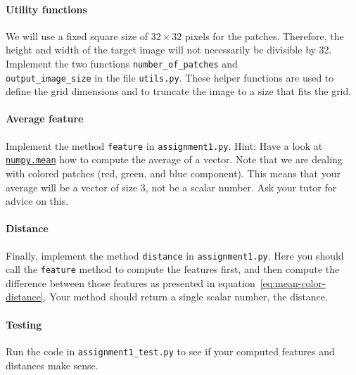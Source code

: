 \documentclass[a4paper]{article}
\begin{document}
		\paragraph{Utility functions} 
		We will use a fixed square size of $32 \times 32$ pixels for the patches.
		Therefore, the height and width of the target image will not necessarily be divisible by 32.
		Implement the two functions \verb|number_of_patches| and \\ 
		\verb|output_image_size| in the file \verb|utils.py|.
		These helper functions are used to define the grid dimensions and to truncate the image to a size that fits the grid.
		
		\paragraph{Average feature}
		Implement the method \verb|feature| in \verb|assignment1.py|. 
		Hint: Have a look at 
		\href{https://docs.scipy.org/doc/numpy/reference/generated/numpy.mean.html}{\texttt{numpy.mean}} how to compute the average of a vector.
		Note that we are dealing with colored patches (red, green, and blue component). 
		This means that your average will be a vector of size 3, not be a scalar number.
		Ask your tutor for advice on this.
		
		\paragraph{Distance}
		Finally, implement the method \verb|distance| in \verb|assignment1.py|.
		Here you should call the \verb|feature| method to compute the features first, and then compute the difference between those features as presented in equation~\ref{eq:mean-color-distance}.
		Your method should return a single scalar number, the distance.
		
		\paragraph{Testing}
		Run the code in \verb|assignment1_test.py| to see if your computed features and distances make sense.
		
\end{document}
